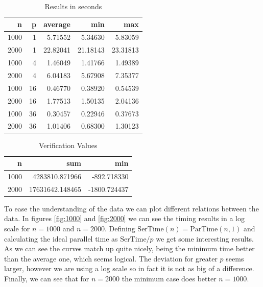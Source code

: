 \documentclass[a4paper]{article}
\begin{document}
    \begin{table}[!htp]
      \center
      \begin{tabular}{*{5}{r}}
        \textbf{n} &  \textbf{p} &   \textbf{average} &       \textbf{min} &       \textbf{max} \\
    \midrule
     1000 & 1 & 5.71552 & 5.34630 & 5.83059\\
     2000 & 1 & 22.82041 & 21.18143 & 23.31813\\
     1000 & 4 & 1.46049 & 1.41766 & 1.49389\\
     2000 & 4 & 6.04183 & 5.67908 & 7.35377\\
     1000 & 16 & 0.46770 & 0.38920 & 0.54539\\
     2000 & 16 & 1.77513 & 1.50135 & 2.04136\\
     1000 & 36 & 0.30457 & 0.22946 & 0.37673\\
     2000 & 36 & 1.01406 & 0.68300 & 1.30123\\
      \end{tabular}
      \caption{Results in seconds}
      \label{tab:Results}
    \end{table}
        
    \begin{table}[!htp]
      \center
      \begin{tabular}{*{3}{r}}
        \textbf{n} &   \textbf{sum} &       \textbf{min}\\
    \midrule
     1000 &  4283810.871966  & -892.718330   \\
     2000 & 17631642.148465  & -1800.724437  \\
      \end{tabular}
      \caption{Verification Values}
      \label{tab:Verification}
    \end{table}

    To ease the understanding of the data we can plot different relations between the data. In figures \ref{fig:1000} and \ref{fig:2000} we can see the timing results in a log scale for $n = 1000$ and $n = 2000$. Defining $\text{SerTime}(n) = \text{ParTime}(n,1)$ and calculating the ideal parallel time as $\text{SerTime}/p$ we get some interesting results. As we can see the curves match up quite nicely, being the minimum time better than the average one, which seems logical. The deviation for greater $p$ seems larger, however we are using a log scale so in fact it is not as big of a difference. Finally, we can see that for $n = 2000$ the minimum case does better $n = 1000$.
\end{document}
